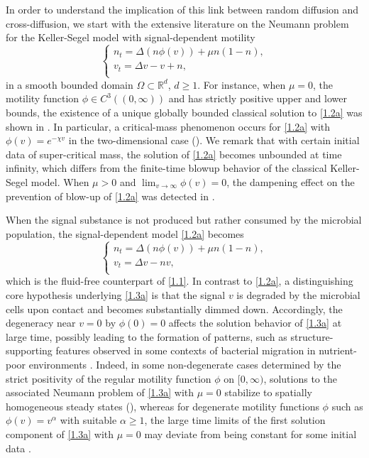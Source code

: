 \documentclass[12pt]{article}
\theoremstyle{plain}
\theoremstyle{definition}
\numberwithin{equation}{section}
\begin{document}
In order to understand the implication of this link between random diffusion and cross-diffusion,
we start with the extensive literature on the Neumann
problem for the Keller-Segel model
with signal-dependent motility %
\begin{equation}\label{1.2a}
\begin{cases}
n_t=\Delta (n\phi(v))+\mu n(1-n),\\
v_t=\Delta v-v+n,\\
\end{cases}
\end{equation}
in a smooth bounded domain $\Omega\subset \mathbb{R}^d$, $d\geq1$. For instance, when $ \mu=0$,  the motility function $\phi\in C^3((0,\infty))$  and has strictly positive upper and lower bounds,
the existence of a unique globally bounded classical solution  to \eqref{1.2a} was shown in \cite{TaoM3AS,XiaoJDE}. In particular,
a critical-mass phenomenon occurs for \eqref{1.2a} with $\phi(v) =e^{-\chi v}$ in the two-dimensional case (\cite{Fujie,JinPAMS}).
We remark that with certain initial data of super-critical mass, the
solution of \eqref{1.2a} becomes unbounded at time infinity, which differs from the finite-time blowup
behavior of the classical Keller-Segel model. When $\mu>0$ and $\displaystyle\lim_{v\rightarrow \infty} \phi(v)=0$, the dampening effect on the prevention of blow-up of \eqref{1.2a}
was  detected in \cite{JinWang,Xiao}.

When the signal substance is not produced but rather consumed by the microbial population, the signal-dependent model \eqref{1.2a} becomes
\begin{equation}\label{1.3a}
\begin{cases}
n_t=\Delta (n\phi(v))+\mu n(1-n),\\
v_t=\Delta v-nv,\\
\end{cases}
\end{equation}
which is the fluid-free counterpart of \eqref{1.1}.
 In contrast to \eqref{1.2a},  a distinguishing core hypothesis  underlying \eqref{1.3a} is that the signal $v$ is degraded  by the microbial cells upon contact and becomes substantially dimmed down. Accordingly,  the degeneracy near $v=0$ by $\phi(0)=0$
affects the solution behavior of \eqref{1.3a} at large time, possibly leading to the formation of patterns, such as structure-supporting features observed in some contexts of bacterial migration in nutrient-poor environments \cite{Leyva,Matsushita}. Indeed, in some non-degenerate cases determined by the strict positivity of %
the regular motility function $\phi$ on $[0,\infty)$,  solutions to the associated  Neumann
problem of \eqref{1.3a}  with $\mu=0$ stabilize to spatially homogeneous steady states (\cite{LiWinkler,PL}), whereas for degenerate motility functions
$\phi$ such as $\phi(v)=v^\alpha$ with suitable $ \alpha\geq 1$, the large time limits of the first solution component of \eqref{1.3a} with $\mu=0$ may deviate from being constant for some initial data \cite{WinklerAIHP,WinklerNonlinearity,LiLou}.
\end{document}

